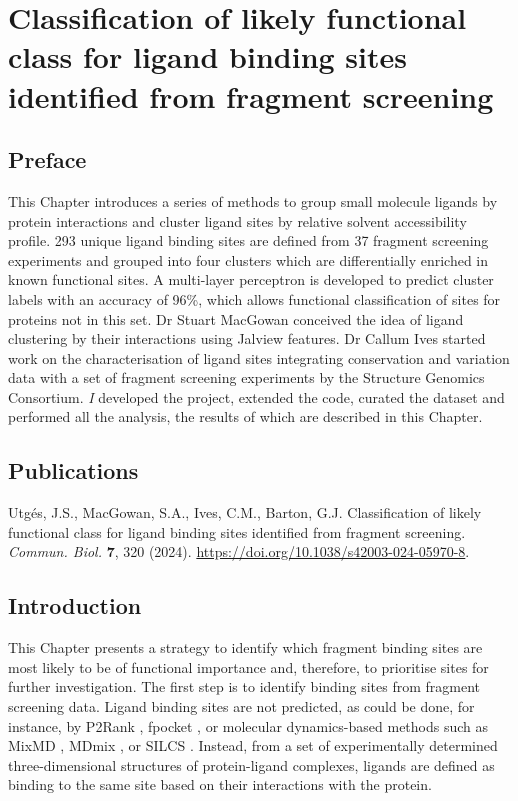 \chapter{Classification of likely functional class for ligand binding sites identified from fragment screening}
\label{chap:FRAGSYS}

\section*{Preface}

This Chapter introduces a series of methods to group small molecule ligands by protein interactions and cluster ligand sites by relative solvent accessibility profile. 293 unique ligand binding sites are defined from 37 fragment screening experiments and grouped into four clusters which are differentially enriched in known functional sites. A multi-layer perceptron is developed to predict cluster labels with an accuracy of 96\%, which allows functional classification of sites for proteins not in this set. Dr Stuart MacGowan conceived the idea of ligand clustering by their interactions using Jalview features. Dr Callum Ives started work on the characterisation of ligand sites integrating conservation and variation data with a set of fragment screening experiments by the Structure Genomics Consortium. \textit{I} developed the project, extended the code, curated the dataset and performed all the analysis, the results of which are described in this Chapter.

\section*{Publications}

Utgés, J.S., MacGowan, S.A., Ives, C.M., Barton, G.J. Classification of likely functional class for ligand binding sites identified from fragment screening. \textit{Commun. Biol.} \textbf{7}, 320 (2024). \url{https://doi.org/10.1038/s42003-024-05970-8}.

\section{Introduction}

This Chapter presents a strategy to identify which fragment binding sites are most likely to be of functional importance and, therefore, to prioritise sites for further investigation. The first step is to identify binding sites from fragment screening data. Ligand binding sites are not predicted, as could be done, for instance, by P2Rank \cite{KRIVAK_2018_P2RANK}, fpocket \cite{GUILLOUX_2009_FPOCKET}, or molecular dynamics-based methods such as MixMD \cite{LEXA_2011_FLEXIBILITY, GHANAKOTA_2018_MIXMD}, MDmix \cite{ALVAREZ_2014_MIXMD}, or SILCS \cite{FALLER_2015_SILCS}. Instead, from a set of experimentally determined three-dimensional structures of protein-ligand complexes, ligands are defined as binding to the same site based on their interactions with the protein.

